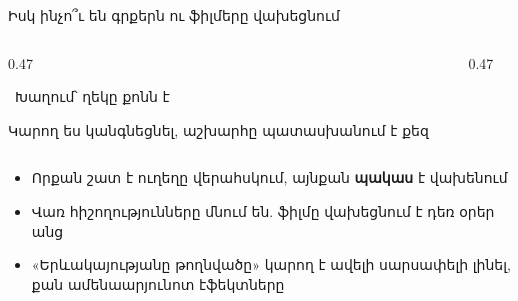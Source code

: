 \begin{frame}{Իսկ ինչո՞ւ են գրքերն ու ֆիլմերը վախեցնում}
  \begin{columns}[T]
    \begin{column}{0.47\textwidth}
      \begin{card}[colback=mint!35!cardwhite]
        \ {\blackfont Խաղում՝ ղեկը քոնն է}\par
        Կարող ես կանգնեցնել, աշխարհը պատասխանում է քեզ
      \end{card}
    \end{column}
    \begin{column}{0.47\textwidth}
    \end{column}
  \end{columns}
  \vspace{2mm}
  \begin{itemize}
    \item<3-> Որքան շատ է ուղեղը վերահսկում, այնքան \textbf{պակաս} է վախենում
    \item<4-> Վառ հիշողությունները մնում են. ֆիլմը վախեցնում է դեռ օրեր անց
    \item<5-> «Երևակայությանը թողնվածը» կարող է ավելի սարսափելի լինել, քան ամենաարյունոտ էֆեկտները
  \end{itemize}
\end{frame}


